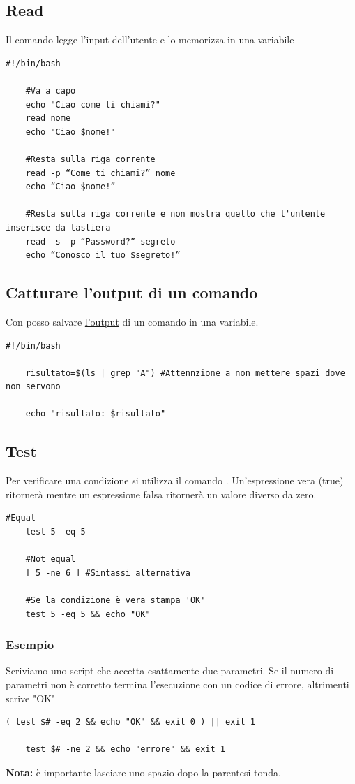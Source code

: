 \documentclass[../main.tex]{subfiles}
\begin{document}
\vspace{1cm}
\subsection{Read}
Il comando  legge l'input dell'utente e lo memorizza in una variabile
\begin{lstlisting}[style=bash]
    #!/bin/bash

    #Va a capo
    echo "Ciao come ti chiami?"
    read nome
    echo "Ciao $nome!"

    #Resta sulla riga corrente
    read -p “Come ti chiami?” nome
    echo “Ciao $nome!”

    #Resta sulla riga corrente e non mostra quello che l'untente inserisce da tastiera
    read -s -p “Password?” segreto
    echo “Conosco il tuo $segreto!”
\end{lstlisting}

\vspace{1cm}
\subsection{Catturare l'output di un comando}
Con \code{\$()} posso salvare \underline{l'output} di un comando in una variabile.
\begin{lstlisting}[style=bash]
    #!/bin/bash

    risultato=$(ls | grep "A") #Attennzione a non mettere spazi dove non servono

    echo "risultato: $risultato"
\end{lstlisting}

\pagebreak
\subsection{Test}
Per verificare una condizione si utilizza il comando . Un'espressione vera (true) ritornerà  mentre un espressione falsa
ritornerà un valore diverso da zero.
\begin{lstlisting}[style=bash]
    #Equal
    test 5 -eq 5

    #Not equal
    [ 5 -ne 6 ] #Sintassi alternativa

    #Se la condizione è vera stampa 'OK'
    test 5 -eq 5 && echo "OK"
\end{lstlisting}

\vspace{0.25cm}
\subsubsection{Esempio}
Scriviamo uno script che accetta esattamente due parametri. Se il numero di parametri non è corretto termina l'esecuzione con un codice 
di errore, altrimenti scrive "OK"
\begin{lstlisting}[style=bash]
    ( test $# -eq 2 && echo "OK" && exit 0 ) || exit 1

    test $# -ne 2 && echo "errore" && exit 1
\end{lstlisting}
\textbf{Nota:} è importante lasciare uno spazio dopo la parentesi tonda.
\end{document}
